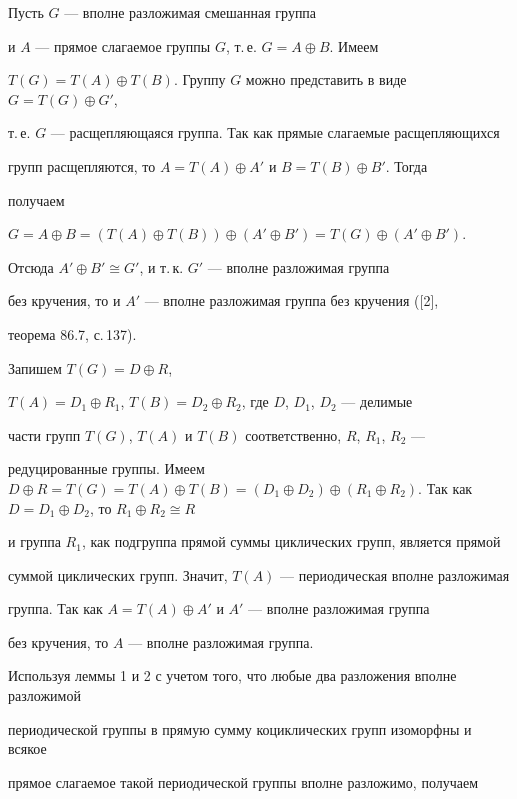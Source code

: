 \begin{pf}


Пусть $G$ --- вполне разложимая смешанная группа


и $A$ --- прямое слагаемое группы $G$, т.\,е. $G=A\oplus B$. Имеем


$T(G)=T(A)\oplus T(B)$. Группу $G$ можно представить в виде $G=T(G)\oplus G'$,


т.\,е. $G$ --- расщепляющаяся группа. Так как прямые слагаемые расщепляющихся


групп расщепляются, то $A=T(A)\oplus A'$ и $B=T(B)\oplus B'$. Тогда


получаем


$G=A\oplus B=(T(A)\oplus T(B))\oplus (A'\oplus B')=T(G)\oplus (A'\oplus B')$.


Отсюда $A'\oplus B'\cong G'$, и т.\,к. $G'$ --- вполне разложимая группа


без кручения, то и $A'$ --- вполне разложимая группа без кручения ([2],


теорема 86.7, с.\,137).


Запишем $T(G)=D\oplus R$,


$T(A)=D_1\oplus R_1$, $T(B)=D_2\oplus R_2$, где $D$, $D_1$, $D_2$ --- делимые


части групп $T(G)$, $T(A)$ и $T(B)$ соответственно, $R$, $R_1$, $R_2$ ---


редуцированные группы. Имеем $D\oplus R=T(G)=T(A)\oplus T(B)=(D_1\oplus D_2)


\oplus (R_1\oplus R_2)$. Так как $D=D_1\oplus D_2$, то $R_1\oplus R_2\cong R$


и группа $R_1$, как подгруппа прямой суммы циклических групп, является прямой


суммой циклических групп. Значит, $T(A)$ --- периодическая вполне разложимая


группа. Так как $A=T(A)\oplus A'$ и $A'$ --- вполне разложимая группа


без кручения, то $A$ --- вполне разложимая группа.


\end{pf}





Используя леммы 1 и 2 с учетом того, что любые два разложения вполне разложимой


периодической группы в прямую сумму коциклических групп изоморфны и всякое


прямое слагаемое такой периодической группы вполне разложимо, получаем





